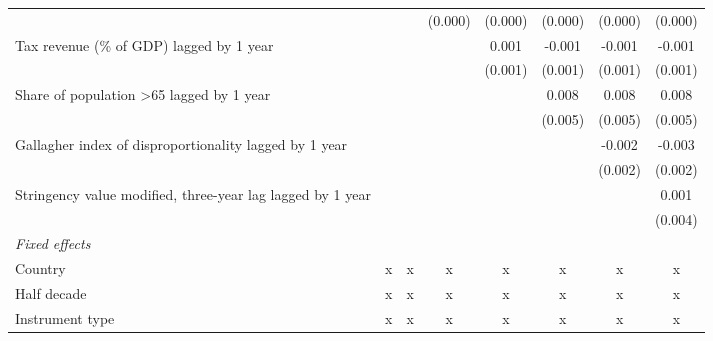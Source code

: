 \begin{tabular}{lccccccc}
                                                                                                &         &         & (0.000) & (0.000) & (0.000)       & (0.000)       & (0.000)\\   
   Tax revenue (\% of GDP) lagged by 1 year                                                     &         &         &         & 0.001   & -0.001        & -0.001        & -0.001\\   
                                                                                                &         &         &         & (0.001) & (0.001)       & (0.001)       & (0.001)\\   
   Share of population >65 lagged by 1 year                                                     &         &         &         &         & 0.008         & 0.008         & 0.008\\   
                                                                                                &         &         &         &         & (0.005)       & (0.005)       & (0.005)\\   
   Gallagher index of disproportionality lagged by 1 year                                       &         &         &         &         &               & -0.002        & -0.003\\   
                                                                                                &         &         &         &         &               & (0.002)       & (0.002)\\   
   Stringency value modified, three-year lag lagged by 1 year                                   &         &         &         &         &               &               & 0.001\\   
                                                                                                &         &         &         &         &               &               & (0.004)\\   
   \emph{Fixed effects}\\
   Country                                                                                      & x       & x       & x       & x       & x             & x             & x\\  
   Half decade                                                                                  & x       & x       & x       & x       & x             & x             & x\\  
   Instrument type                                                                              & x       & x       & x       & x       & x             & x             & x\\  

\end{tabular}
